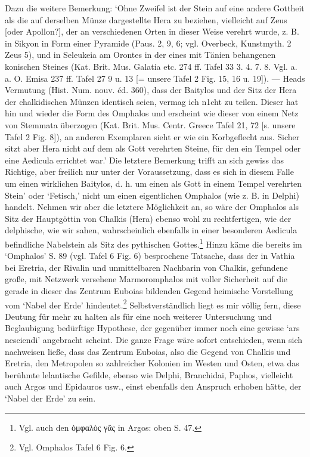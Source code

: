 \documentclass[a4paper, 11pt, oneside]{article}
\begin{document}
Dazu die weitere Bemerkung: `Ohne Zweifel ist der Stein auf eine andere Gottheit als die auf derselben Münze dargestellte Hera zu beziehen, vielleicht auf Zeus [oder Apollon?], der an verschiedenen Orten in dieser Weise verehrt wurde, z. B. in Sikyon in Form einer Pyramide (Paus. 2, 9, 6; vgl. Overbeck, Kunstmyth. 2 Zeus 5), und in Seleukeia am Orontes in der eines mit Tänien behangenen konischen Steines (Kat. Brit. Mus. Galatia etc. 274 ff. Tafel 33 3. 4. 7. 8. Vgl. a. a. O. Emisa 237 ff. Tafel 27 9 u. 13 [= unsere Tafel 2 Fig. 15, 16 u. 19]). --- Heads Vermutung (Hist. Num. nouv. éd. 360), dass der Baitylos und der Sitz der Hera der chalkidischen Münzen identisch seien, vermag ich n1cht zu teilen. Dieser hat hin und wieder die Form des Omphalos und erscheint wie dieser von einem Netz von Stemmata überzogen (Kat. Brit. Mus. Centr. Greece Tafel 21, 72 [s. unsere Tafel 2 Fig. 8]), an anderen Exemplaren sieht er wie ein Korbgeflecht aus. Sicher sitzt aber Hera nicht auf dem als Gott verehrten Steine, für den ein Tempel oder eine Aedicula errichtet war.' Die letztere Bemerkung trifft an sich gewiss das Richtige, aber freilich nur unter der Voraussetzung, dass es sich in diesem Falle um einen wirklichen Baitylos, d. h. um einen als Gott in einem Tempel verehrten Stein' oder `Fetisch,' nicht um einen eigentlichen Omphalos (wie z. B. in Delphi) handelt. Nehmen wir aber die letztere Möglichkeit an, so wäre der Omphalos als Sitz der Hauptgöttin von Chalkis (Hera) ebenso wohl zu rechtfertigen, wie der delphische, wie wir sahen, wahrscheinlich ebenfalls in einer besonderen Aedicula befindliche Nabelstein als Sitz des pythischen Gottes.\footnote{Vgl. auch den ὀμφαλὸς γᾶς in Argos: oben S. 47.} Hinzu käme die bereits im `Omphalos' S. 89 (vgl. Tafel 6 Fig. 6) besprochene Tatsache, dass der in Vathia bei Eretria, der Rivalin und unmittelbaren Nachbarin von Chalkis, gefundene große, mit Netzwerk versehene Marmoromphalos mit voller Sicherheit auf die gerade in dieser das Zentrum Euboias bildenden Gegend heimische Vorstellung vom `Nabel der Erde' hindeutet.\footnote{Vgl. Omphalos Tafel 6 Fig. 6.} Selbstverständlich liegt es mir völlig fern, diese Deutung für mehr zu halten als für eine noch weiterer Untersuchung und Beglaubigung bedürftige Hypothese, der gegenüber immer noch eine gewisse `ars nesciendi' angebracht scheint. Die ganze Frage wäre sofort entschieden, wenn sich nachweisen ließe, dass das Zentrum Euboias, also die Gegend von Chalkis und Eretria, den Metropolen so zahlreicher Kolonien im Westen und Osten, etwa das berühmte lelantische Gefilde, ebenso wie Delphi, Branchidai, Paphos, vielleicht auch Argos und Epidauros usw., einst ebenfalls den Anspruch erhoben hätte, der `Nabel der Erde' zu sein.
\end{document}
